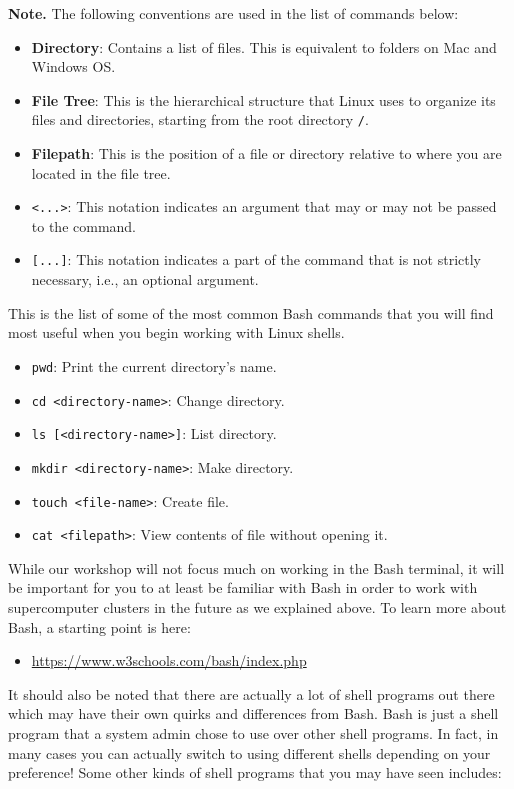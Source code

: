 \documentclass{article}
\begin{document}
\noindent \textbf{Note.} The following conventions are used in the list of commands below:
\begin{itemize}
    \item \textbf{Directory}: Contains a list of files. This is equivalent to folders on Mac and Windows OS. 
    \item \textbf{File Tree}: This is the hierarchical structure that Linux uses to organize its files and directories, starting from the root directory \texttt{/}. 
    \item \textbf{Filepath}: This is the position of a file or directory relative to where you are located in the file tree. 
    \item \texttt{<...>}: This notation indicates an argument that may or may not be passed to the command. 
    \item \texttt{[...]}: This notation indicates a part of the command that is not strictly necessary, i.e., an optional argument. 
\end{itemize}

\noindent This is the list of some of the most common Bash commands that you will find most useful when you begin working with Linux shells. 

\begin{itemize}
    \item \texttt{pwd}: Print the current directory's name. 
    \item \texttt{cd <directory-name>}: Change directory.
    \item \texttt{ls [<directory-name>]}: List directory.
    \item \texttt{mkdir <directory-name>}: Make directory. 
    \item \texttt{touch <file-name>}: Create file.
    \item \texttt{cat <filepath>}: View contents of file without opening it. 
\end{itemize}

\noindent While our workshop will not focus much on working in the Bash terminal, it will be important for you to at least be familiar with Bash in order to work with supercomputer clusters in the future as we explained above. To learn more about Bash, a starting point is here:

\begin{itemize}
    \item \url{https://www.w3schools.com/bash/index.php}
\end{itemize}

\noindent It should also be noted that there are actually a lot of shell programs out there which may have their own quirks and differences from Bash. Bash is just a shell program that a system admin chose to use over other shell programs. In fact, in many cases you can actually switch to using different shells depending on your preference! Some other kinds of shell programs that you may have seen includes:
\end{document}
